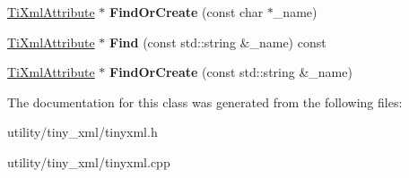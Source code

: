 \begin{DoxyCompactItemize}
\item 
\mbox{\label{class_ti_xml_attribute_set_a5e28f5d32f048fba85d04dc317495bdc}} 
\hyperlink{class_ti_xml_attribute}{Ti\+Xml\+Attribute} $\ast$ {\bfseries Find\+Or\+Create} (const char $\ast$\+\_\+name)
\item 
\mbox{\label{class_ti_xml_attribute_set_a828d42fe3db4ed78bba9ab270190c670}} 
\hyperlink{class_ti_xml_attribute}{Ti\+Xml\+Attribute} $\ast$ {\bfseries Find} (const std\+::string \&\+\_\+name) const
\item 
\mbox{\label{class_ti_xml_attribute_set_acccd76e3d87a92caed2795266c6e540e}} 
\hyperlink{class_ti_xml_attribute}{Ti\+Xml\+Attribute} $\ast$ {\bfseries Find\+Or\+Create} (const std\+::string \&\+\_\+name)
\end{DoxyCompactItemize}


The documentation for this class was generated from the following files\+:\begin{DoxyCompactItemize}
\item 
utility/tiny\+\_\+xml/tinyxml.\+h\item 
utility/tiny\+\_\+xml/tinyxml.\+cpp\end{DoxyCompactItemize}
